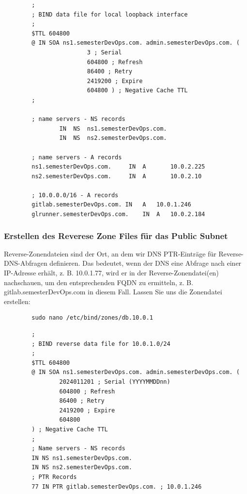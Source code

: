 \documentclass[a4paper,12pt]{article}
\begin{document}
\begin{verbatim}
		;
		; BIND data file for local loopback interface
		;
		$TTL 604800
		@ IN SOA ns1.semesterDevOps.com. admin.semesterDevOps.com. (
						3 ; Serial
						604800 ; Refresh
						86400 ; Retry
						2419200 ; Expire
						604800 ) ; Negative Cache TTL
		;

		; name servers - NS records
				IN	NS 	ns1.semesterDevOps.com.
				IN 	NS 	ns2.semesterDevOps.com.

		; name servers - A records
		ns1.semesterDevOps.com. 	IN	A		10.0.2.225
		ns2.semesterDevOps.com. 	IN	A		10.0.2.10

		; 10.0.0.0/16 - A records
		gitlab.semesterDevOps.com. IN 	A 	10.0.1.246
		glrunner.semesterDevOps.com. 	IN 	A 	10.0.2.184
\end{verbatim}


\subsubsection{Erstellen des Reverese Zone Files für das Public Subnet}
Reverse-Zonendateien sind der Ort, an dem wir DNS PTR-Einträge für Reverse-DNS-Abfragen definieren. 
Das bedeutet, wenn der DNS eine Abfrage nach einer IP-Adresse erhält, z. B. 10.0.1.77, wird er in der Reverse-Zonendatei(en) nachschauen, um den entsprechenden FQDN zu ermitteln, z. B. gitlab.semesterDevOps.com in diesem Fall.
Lassen Sie uns die Zonendatei erstellen:

\begin{verbatim}
		sudo nano /etc/bind/zones/db.10.0.1
\end{verbatim}
\begin{verbatim}
		;
		; BIND reverse data file for 10.0.1.0/24
		;
		$TTL 604800
		@ IN SOA ns1.semesterDevOps.com. admin.semesterDevOps.com. (
				2024011201 ; Serial (YYYYMMDDnn)
				604800 ; Refresh
				86400 ; Retry
				2419200 ; Expire
				604800 
		) ; Negative Cache TTL
		;
		; Name servers - NS records
		IN NS ns1.semesterDevOps.com.
		IN NS ns2.semesterDevOps.com.
		; PTR Records
		77 IN PTR gitlab.semesterDevOps.com. ; 10.0.1.246
\end{verbatim}
\end{document}
